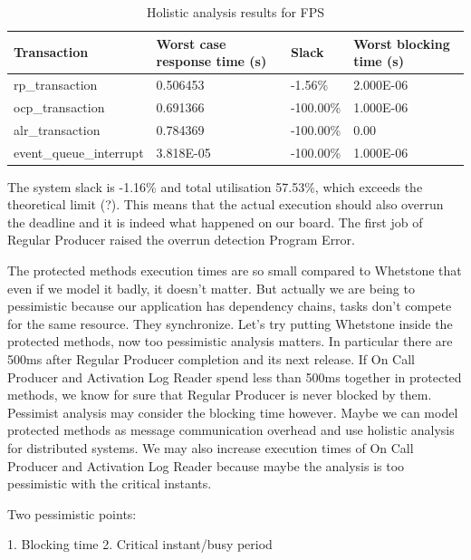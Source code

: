 \documentclass{article}
\begin{document}
\begin{table}[!htbp]
   \centering
   \begin{tabular}{llll}
     \toprule
     Transaction & Worst case response time (s) & Slack & Worst blocking time (s)  \\
     \midrule
     rp\_transaction & 0.506453  & -1.56\% &  2.000E-06  \\
     ocp\_transaction & 0.691366 & -100.00\% & 1.000E-06 \\
     alr\_transaction & 0.784369 & -100.00\% & 0.00 \\
     event\_queue\_interrupt & 3.818E-05 & -100.00\% & 1.000E-06 \\
     \bottomrule
   \end{tabular}
   \caption{Holistic analysis results for FPS}
   \label{tab:holistic-fps}
\end{table}

The system slack is -1.16\% and total utilisation 57.53\%, which exceeds the theoretical limit (?). This means that the actual execution should also overrun the deadline and it is indeed what happened on our board. The first job of Regular Producer raised the overrun detection Program Error.

The protected methods execution times are so small compared to Whetstone that even if we model it badly, it doesn't matter. But actually we are being to pessimistic because our application has dependency chains, tasks don't compete for the same resource. They synchronize. Let's try putting Whetstone inside the protected methods, now too pessimistic analysis matters. In particular there are 500ms after Regular Producer completion and its next release. If On Call Producer and Activation Log Reader spend less than 500ms together in protected methods, we know for sure that Regular Producer is never blocked by them. Pessimist analysis may consider the blocking time however. Maybe we can model protected methods as message communication overhead and use holistic analysis for distributed systems.
We may also increase execution times of On Call Producer and Activation Log Reader because maybe the analysis is too pessimistic with the critical instants.

Two pessimistic points:

1. Blocking time
2. Critical instant/busy period


\end{document}
